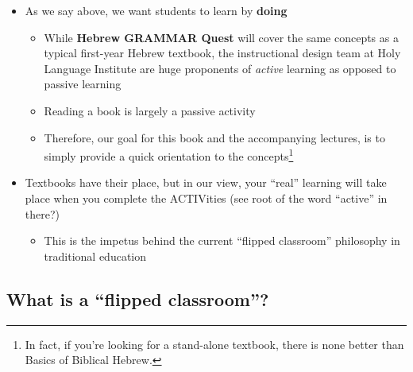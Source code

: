 \documentclass[
]{turabian-researchpaper}
\providecommand{\tightlist}{%
  \setlength{\itemsep}{0pt}\setlength{\parskip}{0pt}}
\begin{document}
\begin{itemize}
\tightlist
\item
  As we say above, we want students to learn by \textbf{doing}

  \begin{itemize}
  \tightlist
  \item
    While \textbf{Hebrew GRAMMAR Quest} will cover the same concepts as a typical first-year Hebrew textbook, the instructional design team at Holy Language Institute are huge proponents of \emph{active} learning as opposed to passive learning
  \item
    Reading a book is largely a passive activity
  \item
    Therefore, our goal for this book and the accompanying lectures, is to simply provide a quick orientation to the concepts\footnote{In fact, if you're looking for a stand-alone textbook, there is none better than Basics of Biblical Hebrew.}
  \end{itemize}
\item
  Textbooks have their place, but in our view, your ``real'' learning will take place when you complete the ACTIVities (see root of the word ``active'' in there?)

  \begin{itemize}
  \tightlist
  \item
    This is the impetus behind the current ``flipped classroom'' philosophy in traditional education
  \end{itemize}
\end{itemize}

\hypertarget{what-is-a-flipped-classroom}{%
\subsection*{What is a ``flipped classroom''?}\label{what-is-a-flipped-classroom}}
\end{document}
